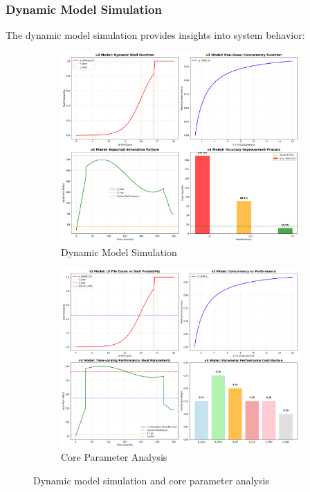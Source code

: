 \documentclass[11pt,twocolumn]{article}
\begin{document}
\subsubsection{Dynamic Model Simulation}
The dynamic model simulation provides insights into system behavior:

\begin{figure}[H]
\centering
\begin{subfigure}{0.48\textwidth}
\centering
\includegraphics[width=\textwidth]{experiments/2025-09-05/v3_model_simulation_visualization.png}
\caption{Dynamic Model Simulation}
\label{fig:model_simulation}
\end{subfigure}
\hfill
\begin{subfigure}{0.48\textwidth}
\centering
\includegraphics[width=\textwidth]{experiments/2025-09-05/v3_core_parameter_analysis.png}
\caption{Core Parameter Analysis}
\label{fig:core_parameters}
\end{subfigure}
\caption{Dynamic model simulation and core parameter analysis}
\end{figure}
\end{document}
